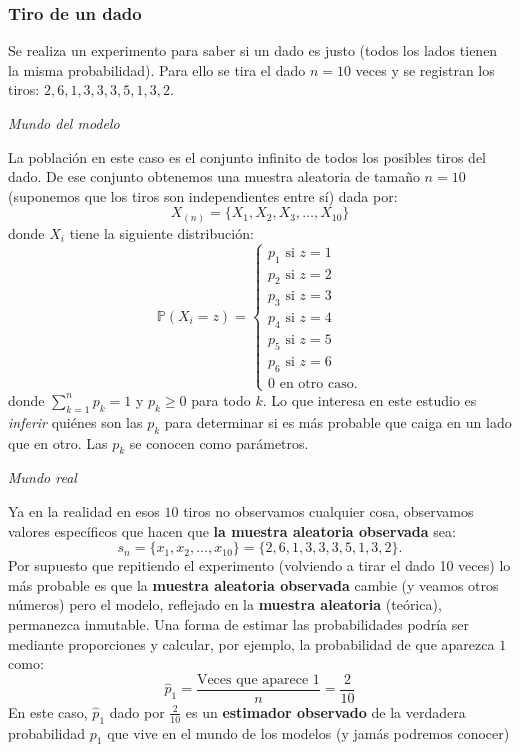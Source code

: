 \documentclass[
]{book}
\newenvironment{Ejemplo}
{\begin{mdframed}[
  linecolor=ejemplocolor,
  skipabove=12pt,
  skipbelow=12pt,
  roundcorner=20pt,
  splittopskip=2\topsep]}
{\end{mdframed}}
\begin{document}
\begin{Ejemplo}
\hypertarget{tiro-de-un-dado}{%
\subsubsection{Tiro de un dado}\label{tiro-de-un-dado}}

Se realiza un experimento para saber si un dado es justo (todos los
lados tienen la misma probabilidad). Para ello se tira el dado
\(n = 10\) veces y se registran los tiros: \(2,6,1,3,3,3,5,1,3,2\).

\emph{Mundo del modelo}

La población en este caso es el conjunto infinito de todos los posibles
tiros del dado. De ese conjunto obtenemos una muestra aleatoria de
tamaño \(n = 10\) (suponemos que los tiros son independientes entre sí)
dada por: \[
X_{(n)} = \{ X_1, X_2, X_3, \dots, X_{10}\}
\] donde \(X_i\) tiene la siguiente distribución: \[
\mathbb{P}(X_i = z) = 
\begin{cases}
p_1  \text{ si } z = 1 \\
p_2  \text{ si } z = 2 \\
p_3  \text{ si } z = 3 \\
p_4  \text{ si } z = 4 \\
p_5  \text{ si } z = 5 \\
p_6  \text{ si } z = 6 \\
0  \text{ en otro caso.}
\end{cases}
\] donde \(\sum_{k = 1}^n p_k = 1\) y \(p_{k} \geq 0\) para todo \(k\).
Lo que interesa en este estudio es \emph{inferir} quiénes son las
\(p_k\) para determinar si es más probable que caiga en un lado que en
otro. Las \(p_k\) se conocen como parámetros.

\emph{Mundo real}

Ya en la realidad en esos \(10\) tiros no observamos cualquier cosa,
observamos valores específicos que hacen que \textbf{la muestra
aleatoria observada} sea: \[
s_n = \{x_1, x_2, \dots, x_{10} \} = \{2,6,1,3,3,3,5,1,3,2\}.
\] Por supuesto que repitiendo el experimento (volviendo a tirar el dado
10 veces) lo más probable es que la \textbf{muestra aleatoria observada}
cambie (y veamos otros números) pero el modelo, reflejado en la
\textbf{muestra aleatoria} (teórica), permanezca inmutable. Una forma de
estimar las probabilidades podría ser mediante proporciones y calcular,
por ejemplo, la probabilidad de que aparezca \(1\) como: \[
\hat{p}_1 = \frac{\text{Veces que aparece 1}}{n} = \frac{2}{10}
\] En este caso, \(\hat{p}_1\) dado por \(\frac{2}{10}\) es un
\textbf{estimador observado} de la verdadera probabilidad \(p_1\) que
vive en el mundo de los modelos (y jamás podremos conocer)
\end{Ejemplo}
\end{document}

